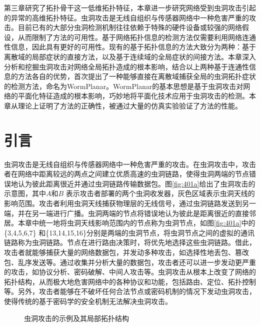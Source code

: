第三章研究了拓扑骨干这一低维拓扑特征，本章进一步研究网络受到虫洞攻击引起的异常的高维拓扑特征。虫洞攻击是无线自组织与传感器网络中一种危害严重的攻击。目前已有的大部分虫洞检测机制往往依赖于特殊的硬件设备或较强的网络假设，从而限制了方法的可用性。基于网络拓扑信息的检测方法仅需要利用网络连通性信息，因此具有更好的可用性。现有的基于拓扑信息的方法大致分为两种：基于离散域的局部症状的直接方法，以及基于连续域的全局症状的间接方法。本章深入分析和挖掘虫洞攻击对网络全局拓扑造成的根本影响，结合以上两种基于连通性信息的方法各自的优势，首次提出了一种能够直接在离散域捕获全局的虫洞拓扑症状的检测方法，命名为WormPlanar。WormPlanar的基本思想是基于虫洞攻击对网络的平面化特征造成的根本影响，巧妙地将平面化技术应用于虫洞攻击的检测。本章从理论上证明了方法的正确性，被通过大量的仿真实验验证了方法的性能。
\section{引言}
虫洞攻击是无线自组织与传感器网络中一种危害严重的攻击。在虫洞攻击中，攻击者在网络中距离较远的两点之间建立优质高速的虫洞链路，使得虫洞两端的节点错误地认为彼此距离很近并通过虫洞链路传输数据包。图\ref{fig:401a}给出了虫洞攻击的示意图，其中$A$和$B$ 表示攻击者部署的两个虫洞收发器，灰色区域表示虫洞天线的影响范围。攻击者利用虫洞天线捕获物理层的无线信号，通过虫洞链路发送到另一端，并在另一端进行广播。虫洞两端的节点将错误地认为彼此是距离很近的直接邻居。本章中统一地将虫洞天线影响范围内的节点称为虫洞节点，如图\ref{fig:401a}中的\{3,4,5,6,7\} 和\{13,14,15,16\}分别是两端的虫洞节点，将虫洞节点之间的虚拟的通讯链路称为虫洞链路。节点在进行路由决策时，将优先地选择这些虫洞链路。借此，攻击者就能够捕获大量的网络数据包，并发动多种攻击，如选择性地丢包、篡改包、乱序发送等。通过收集并分析大量的数据包，攻击者还可以进一步发动更严重的攻击，如协议分析、密码破解、中间人攻击等。虫洞攻击从根本上改变了网络的拓扑结构，从而极大地危害网络中的各种协议和功能，包括路由、定位、拓扑控制等。另外，攻击者能够在不破坏任何合法节点或密码机制的情况下发动虫洞攻击，使得传统的基于密码学的安全机制无法解决虫洞攻击。
\begin{figure}[t]
  \centering
  \hspace{1em}
  \caption{虫洞攻击的示例及其局部拓扑结构}
  \label{fig:401}
\end{figure}

